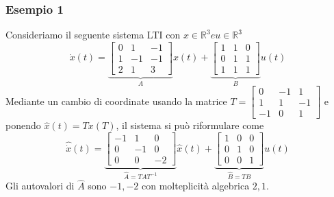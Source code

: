 \documentclass{article}
\begin{document}
\subsubsection{Esempio 1}
Consideriamo il seguente sistema LTI con $x \in \mathbb{R}^3 e u \in \mathbb{R}^3$
\[
    \dot x(t) = \underbrace{\begin{bmatrix}
        0 & 1 & -1\\
        1 & -1 & -1\\
        2 & 1 & 3 
    \end{bmatrix}}_{A} x(t) +
    \underbrace{\begin{bmatrix}
        1 & 1 & 0\\
        0 & 1 & 1\\
        1 & 1 & 1
    \end{bmatrix}}_{B} u(t)
\]
Mediante un cambio di coordinate usando la matrice $T = \begin{bmatrix}
    0 & -1 & 1\\ 1 & 1 & -1\\ -1 & 0 & 1
\end{bmatrix}$ e ponendo $\hat x(t) = T x(T)$, il sistema si può riformulare come 
\[
    \hat{\dot x} (t)= \underbrace{\begin{bmatrix}
        -1 & 1 & 0\\
        0 & -1 & 0\\
        0 & 0 & -2 
    \end{bmatrix}}_{\hat A = TAT^{-1}} \hat x(t) +
    \underbrace{\begin{bmatrix}
        1 & 0 & 0\\
        0 & 1 & 0\\
        0 & 0 & 1
    \end{bmatrix}}_{\hat B = TB} u(t)
\]
Gli autovalori di $\hat A$ sono $-1, -2$ con molteplicità algebrica $2,1$.
\end{document}
